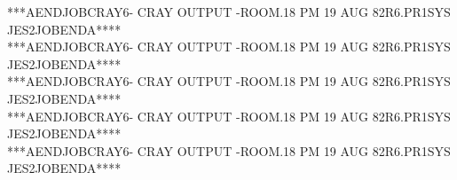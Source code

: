 {\ttfamily ****A\quad END\quad JOB\quad CRAY6\quad- CRAY OUTPUT -\quad ROOM.18 PM 19 AUG 82\quad R6.PR1\quad SYS JES2\quad JOB\quad END\quad A****}\\
{\ttfamily ****A\quad END\quad JOB\quad CRAY6\quad- CRAY OUTPUT -\quad ROOM.18 PM 19 AUG 82\quad R6.PR1\quad SYS JES2\quad JOB\quad END\quad A****}\\
{\ttfamily ****A\quad END\quad JOB\quad CRAY6\quad- CRAY OUTPUT -\quad ROOM.18 PM 19 AUG 82\quad R6.PR1\quad SYS JES2\quad JOB\quad END\quad A****}\\
{\ttfamily ****A\quad END\quad JOB\quad CRAY6\quad- CRAY OUTPUT -\quad ROOM.18 PM 19 AUG 82\quad R6.PR1\quad SYS JES2\quad JOB\quad END\quad A****}\\
{\ttfamily ****A\quad END\quad JOB\quad CRAY6\quad- CRAY OUTPUT -\quad ROOM.18 PM 19 AUG 82\quad R6.PR1\quad SYS JES2\quad JOB\quad END\quad A****}\\
